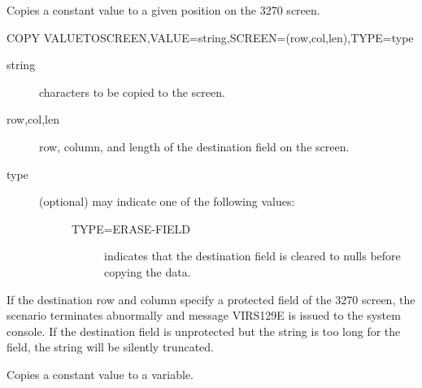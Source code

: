 \documentclass[letterpaper,10pt,english]{sphinxmanual}
\begin{document}

Copies a constant value to a given position on the 3270 screen.

\begin{sphinxVerbatim}[commandchars=\\\{\}]
COPY\PYGZdl{} VALUE\PYGZhy{}TO\PYGZhy{}SCREEN,VALUE=\PYGZsq{}string\PYGZsq{},SCREEN=(row,col,len),TYPE=type
\end{sphinxVerbatim}
\begin{description}
\item[{string}] \leavevmode
characters to be copied to the screen.

\item[{row,col,len}] \leavevmode
row, column, and length of the destination field on the screen.

\item[{type}] \leavevmode\begin{description}
\item[{(optional) may indicate one of the following values:}] \leavevmode\begin{description}
\item[{TYPE=ERASE-FIELD}] \leavevmode
indicates that the destination field is cleared to nulls before copying the data.

\end{description}

\end{description}

\end{description}

If the destination row and column specify a protected field of the 3270 screen, the scenario terminates abnormally and message VIRS129E is issued to the system console. If the destination field is unprotected but the string is too long for the field, the string will be silently truncated.


Copies a constant value to a variable.
\end{document}
